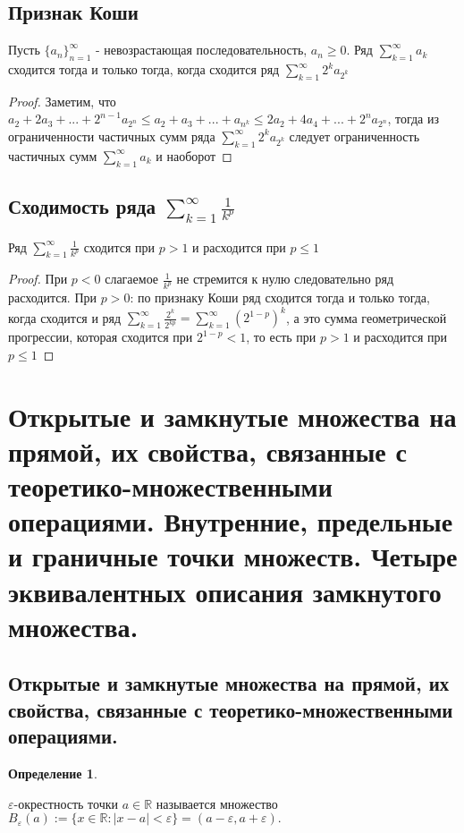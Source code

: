 \documentclass[12pt]{article}
\theoremstyle{definition}
\begin{document}
\subsection{Признак Коши}
Пусть $\textstyle\{a_n\}_{n=1}^{\infty}$ - невозрастающая последовательность, $ a_n \geq 0$. Ряд $\displaystyle\sum_{k = 1}^{\infty}a_k$ сходится тогда и только тогда, когда сходится ряд $\displaystyle\sum_{k = 1}^{\infty}2^k a_{2^k}$
\begin{proof}
Заметим, что $a_2 + 2a_3 + ... + 2^{n-1}a_{2^n} \leq a_2 + a_3 + ... + a_{n^k} \leq 2a_2+ 4a_4 + ... + 2^n a_{2^n}$, тогда из ограниченности частичных сумм ряда $
\displaystyle\sum_{k = 1}^{\infty}2^k a_{2^k}$ следует ограниченность частичных сумм $\displaystyle\sum_{k = 1}^{\infty}a_k$ и наоборот
\end{proof}

\subsection{Сходимость ряда $\displaystyle\sum_{k = 1}^{\infty}\frac{1}{k^p}$}
Ряд $\displaystyle\sum_{k = 1}^{\infty}\frac{1}{k^p}$ сходится при $p > 1$ и расходится при $p \leq 1$
\begin{proof}
При $p < 0$ слагаемое $\frac{1}{k^p}$ не стремится к нулю следовательно ряд расходится.
При $p > 0$: по признаку Коши ряд сходится тогда и только тогда, когда сходится и ряд $\displaystyle\sum_{k = 1}^{\infty}\frac{2^k}{2^{kp}} = \displaystyle\sum_{k = 1}^{\infty}(2^{1-p})^k$, а это сумма геометрической прогрессии, которая сходится при $2^{1-p} < 1$, то есть при $p > 1$ и расходится при $p \leq 1$
\end{proof}

\section{Открытые и замкнутые множества на прямой, их свойства, связанные с теоретико-множественными операциями. Внутренние, предельные и граничные точки множеств. Четыре эквивалентных описания замкнутого множества.}

\subsection{Открытые и замкнутые множества на прямой, их свойства, связанные с теоретико-множественными операциями.}

\textbf{Определение 1}.

$\varepsilon$-окрестность точки $a \in\mathbb{R}$ называется множество $B_\varepsilon(a) := \{x\in\mathbb{R}: |x-a| < \varepsilon\} = (a-\varepsilon, a +\varepsilon).$
\end{document}
